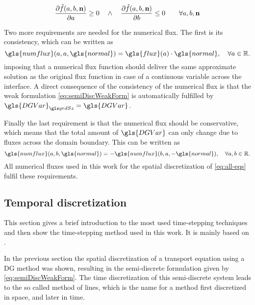 \begin{equation}
	\label{eq:flux_monotonicity}
	\frac{\partial \hat{f}(a, b, \textbf{n})}{\partial a} \geq 0 \quad\land\quad \frac{\partial \hat{f}(a, b, \textbf{n})}{\partial b} \leq 0 \qquad \forall a, b, \textbf{n}
\end{equation}

Two more requirements are needed for the numerical flux. The first is its consistency, which can be written as
\begin{equation}
	\gls{numflux}(a,a,\gls{normal}) = \gls{flux}(a) \cdot \gls{normal}, \quad \forall a \in \mathbb{R}. 
	\label{eq:consistency}
\end{equation}
imposing that a numerical flux function should deliver the same approximate solution as the original flux function in case of a continuous variable across the interface. A direct consequence of the consistency of the numerical flux is that the weak formulation \cref{eq:semiDiscWeakForm} is automatically fulfilled by $\nuM{\gls{DGVar}} = \gls{DGVar}$.

Finally the last requirement is that the numerical flux should be conservative, which means that the total amount of $\gls{DGVar}$ can only change due to fluxes across the domain boundary. This can be written as
\begin{equation}
	\gls{numflux}(a,b,\gls{normal}) = 	-\gls{numflux}(b,a,-\gls{normal}), \quad \forall a,b \in \mathbb{R}. 
	\label{eq:conservativity}
\end{equation}
All numerical fluxes used in this work for the spatial discretization of \cref{eq:all-eqs} fulfil these requirements.%
\subsection{Temporal discretization}\label{ssec:TemporalDiscretization}
This section gives a brief introduction to the most used time-stepping techniques and then show the time-stepping method used in this work. It is mainly based on \textcite{levequeFiniteVolumeMethods2002,ferzigerComputationalMethodsFluid2002}.

In the previous section the spatial discretization of a transport equation using a DG method was shown, resulting in the semi-discrete formulation given by \cref{eq:semiDiscWeakForm}.
The time discretization of this semi-discrete system leads to the so called method of lines, which is the name for a method first discretized in space, and later in time.  

